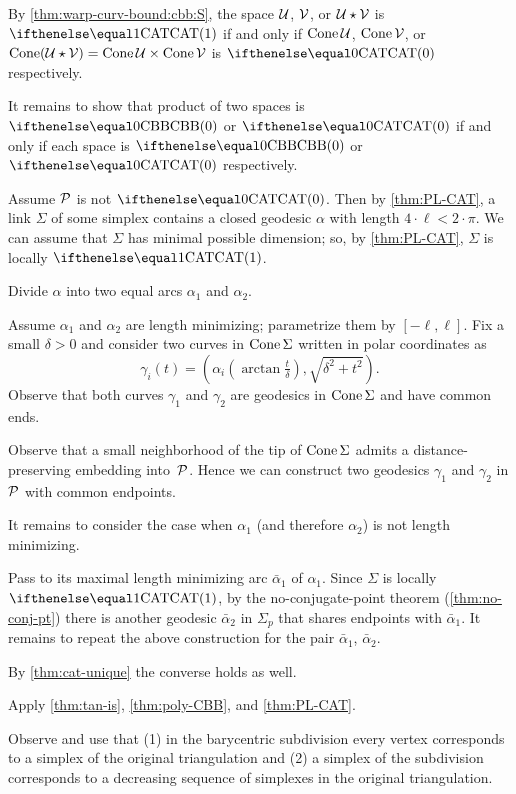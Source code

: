 By \ref{thm:warp-curv-bound:cbb:S}, the space $\mathcal{U}$, $\mathcal{V}$, or $\mathcal{U}\star\mathcal{V}$ is $\CAT1$ if and only if $\mathop{\rm Cone}\nolimits\mathcal{U}$, $\mathop{\rm Cone}\nolimits\mathcal{V}$, or $\Cone(\spc{U}\star\spc{V})=\Cone\spc{U}\times\Cone\spc{V}$ is $\CAT0$ respectively.

It remains to show that product of two spaces is $\Alex0$ or $\CAT0$ if and only if each space is $\Alex0$ or $\CAT0$ respectively.

Assume $\mathcal{P}$ is not $\CAT0$.
Then by \ref{thm:PL-CAT}, a link $\Sigma$ of some simplex contains a closed geodesic $\alpha$ with length $4\cdot\ell<2\cdot\pi$.
We can assume that $\Sigma$ has minimal possible dimension;
so, by \ref{thm:PL-CAT}, $\Sigma$ is locally $\CAT1$.

Divide $\alpha$ into two equal arcs $\alpha_1$ and $\alpha_2$.

Assume $\alpha_1$ and $\alpha_2$ are length minimizing;
parametrize them by $[-\ell,\ell]$.
Fix a small $\delta>0$ and 
consider two curves in $\mathop{\rm Cone}\nolimits\Sigma$ written in polar coordinates as 
\[\gamma_i(t)=(\alpha_i(\arctan \tfrac t\delta),\sqrt{\delta^2+t^2}).\]
Observe that both curves $\gamma_1$ and $\gamma_2$ are geodesics in $\mathop{\rm Cone}\nolimits\Sigma$ and  have common ends.

Observe that a small neighborhood of the tip of $\mathop{\rm Cone}\nolimits\Sigma$ admits a distance-preserving embedding into~$\mathcal{P}$.
Hence we can construct two geodesics $\gamma_1$ and $\gamma_2$ in $\mathcal{P}$ with common endpoints.

It remains to consider the case when $\alpha_1$ (and therefore $\alpha_2$) is not length minimizing.

Pass to its maximal length minimizing arc $\bar\alpha_1$ of $\alpha_1$.
Since $\Sigma$ is locally $\CAT1$, by the no-conjugate-point theorem (\ref{thm:no-conj-pt}) 
there is another geodesic $\bar\alpha_2$ in $\Sigma_p$ that shares endpoints with $\bar\alpha_1$.
It remains to repeat the above construction for the pair $\bar\alpha_1$, $\bar\alpha_2$.

By \ref{thm:cat-unique} the converse holds as well.

 Apply \ref{thm:tan-is}, \ref{thm:poly-CBB}, and \ref{thm:PL-CAT}.

Observe and use that (1) in the barycentric subdivision every vertex corresponds to a simplex of the original triangulation
and (2) a simplex of the subdivision corresponds to a decreasing sequence of simplexes in the original triangulation. 

